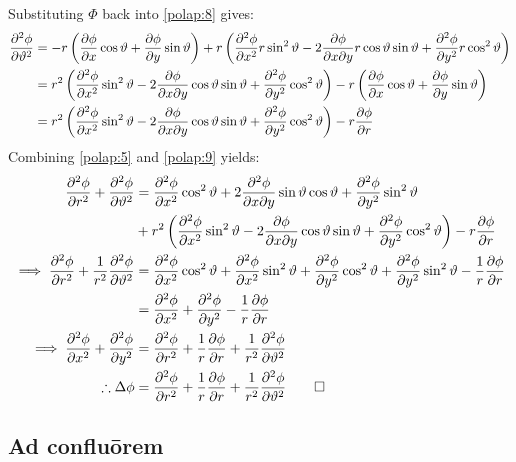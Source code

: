 \documentclass[a4paper,12pt]{article}
\renewcommand{\theta}{\vartheta}      		%
\newcommand{\partialder}[2]{\frac{\partial #1}{\partial #2}}        %
\begin{document}
Substituting $\Phi$ back into \ref{polap:8} gives:
\begin{align}
	\notag\frac{\partial^2\phi}{\partial\theta^2}&=-r\left(\partialder{\phi}{x}\cos\theta+\partialder{\phi}{y}\sin\theta\right)+r\left(\frac{\partial^2\phi}{\partial x^2}r\sin^2\theta-2\frac{\partial\phi}{\partial x\partial y}r\cos\theta\sin\theta+\frac{\partial^2\phi}{\partial y^2}r\cos^2\theta\right)\\
	\notag&=r^2\left(\frac{\partial^2\phi}{\partial x^2}\sin^2\theta-2\frac{\partial\phi}{\partial x\partial y}\cos\theta\sin\theta+\frac{\partial^2\phi}{\partial y^2}\cos^2\theta\right)-r\left(\partialder{\phi}{x}\cos\theta+\partialder{\phi}{y}\sin\theta\right)\\
	\label{polap:9}&=r^2\left(\frac{\partial^2\phi}{\partial x^2}\sin^2\theta-2\frac{\partial\phi}{\partial x\partial y}\cos\theta\sin\theta+\frac{\partial^2\phi}{\partial y^2}\cos^2\theta\right)-r\partialder{\phi}{r}
\end{align}
Combining \ref{polap:5} and \ref{polap:9} yields:
\begin{align}
	\notag\frac{\partial^2\phi}{\partial r^2}+\frac{\partial^2\phi}{\partial\theta^2}&=\frac{\partial^2\phi}{\partial x^2}\cos^2\theta+2\frac{\partial^2\phi}{\partial x\partial y}\sin\theta\cos\theta+\frac{\partial^2\phi}{\partial y^2}\sin^2\theta\\
	\notag&+r^2\left(\frac{\partial^2\phi}{\partial x^2}\sin^2\theta-2\frac{\partial\phi}{\partial x\partial y}\cos\theta\sin\theta+\frac{\partial^2\phi}{\partial y^2}\cos^2\theta\right)-r\partialder{\phi}{r}\\
	\notag\implies\frac{\partial^2\phi}{\partial r^2}+\frac{1}{r^2}\frac{\partial^2\phi}{\partial\theta^2}&=\frac{\partial^2\phi}{\partial x^2}\cos^2\theta+\frac{\partial^2\phi}{\partial x^2}\sin^2\theta+\frac{\partial^2\phi}{\partial y^2}\cos^2\theta+\frac{\partial^2\phi}{\partial y^2}\sin^2\theta-\frac{1}{r}\partialder{\phi}{r}\\
	\notag&=\frac{\partial^2\phi}{\partial x^2}+\frac{\partial^2\phi}{\partial y^2}-\frac{1}{r}\partialder{\phi}{r}\\
	\notag\implies\frac{\partial^2\phi}{\partial x^2}+\frac{\partial^2\phi}{\partial y^2}&=\frac{\partial^2\phi}{\partial r^2}+\frac{1}{r}\partialder{\phi}{r}+\frac{1}{r^2}\frac{\partial^2\phi}{\partial\theta^2}\\
	\label{polap:final}\therefore\Delta\phi&=\frac{\partial^2\phi}{\partial r^2}+\frac{1}{r}\partialder{\phi}{r}+\frac{1}{r^2}\frac{\partial^2\phi}{\partial\theta^2}\qed
\end{align}

\subsection{Ad confluōrem}
\end{document}
